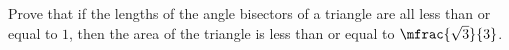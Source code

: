 Prove that if the lengths of the angle bisectors of a triangle are all less than or equal to $1$,
then the area of the triangle is less than or equal to $\mfrac{\sqrt{3}}{3}$.
